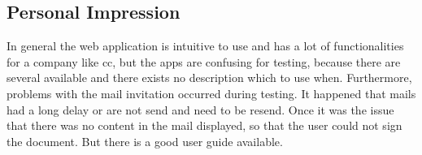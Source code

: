 \subsection{Personal Impression}
In general the web application is intuitive to use and has a lot of functionalities for a company like \gls{cc}, but the \glspl{app} are confusing for testing, because there are several available and there exists no description which to use when. Furthermore, problems with the mail invitation occurred during testing. It happened that mails had a long delay or are not send and need to be resend. Once it was the issue that there was no content in the mail displayed, so that the user could not sign the document. But there is a good user guide available.